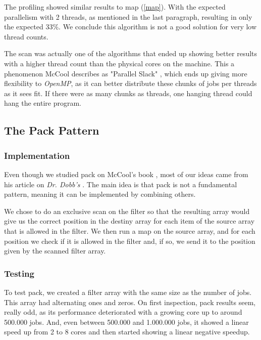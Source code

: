 \documentclass[10pt,journal]{IEEEtran}
\begin{document}
The profiling showed similar results to map (\ref{map}). With the expected parallelism with 2 threads, as mentioned in the last paragraph, resulting in only the expected 33\%. We conclude this algorithm is not a good solution for very low thread counts.

The scan was actually one of the algorithms that ended up showing better results with a higher thread count than the physical cores on the machine. This a phenomenon McCool describes as "Parallel Slack" \cite{mccool}, which ends up giving more flexibility to \textit{OpenMP}, as it can better distribute these chunks of jobs per threads as it sees fit. If there were as many chunks as threads, one hanging thread could hang the entire program.

\subsection{The Pack Pattern}
\subsubsection{Implementation}
\label{pack}

Even though we studied pack on McCool's book \cite{mccool}, most of our ideas came from his article on \textit{Dr. Dobb's} \cite{dobbpack}. The main idea is that pack is not a fundamental pattern, meaning it can be implemented by combining others. 

We chose to do an exclusive scan on the filter so that the resulting array would give us the correct position in the destiny array for each item of the source array that is allowed in the filter. We then run a map on the source array, and for each position we check if it is allowed in the filter and, if so, we send it to the position given by the scanned filter array.

\subsubsection{Testing}

To test pack, we created a filter array with the same size as the number of jobs. This array had alternating ones and zeros. On first inspection, pack results seem, really odd, as its performance deteriorated with a growing core up to around 500.000 jobs. And, even between 500.000 and 1.000.000 jobs, it showed a linear speed up from 2 to 8 cores and then started showing a linear negative speedup.
\end{document}
